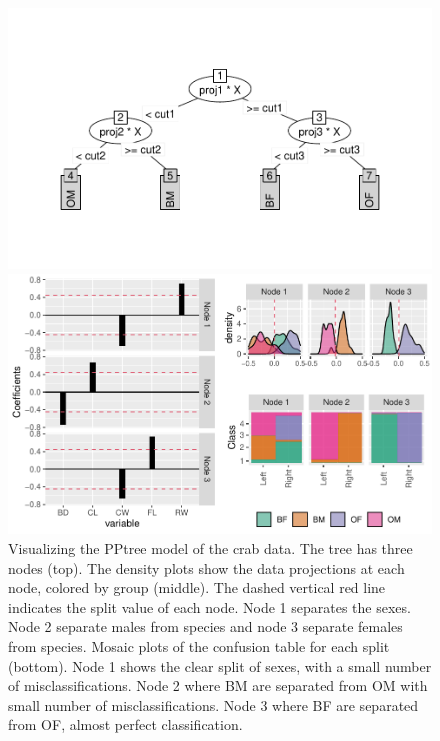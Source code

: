 \documentclass[smallextended,natbib]{svjour3}\usepackage[]{graphicx}\usepackage[]{xcolor}
\makeatletter
\def\maxwidth{ %
  \ifdim\Gin@nat@width>\linewidth
    \linewidth
  \else
    \Gin@nat@width
  \fi
}
\newenvironment{knitrout}{}{} %
\makeatother
\begin{document}
\begin{figure}[hbpt]
\centering
\begin{knitrout}
\color{fgcolor}
\includegraphics[width=\maxwidth]{trcomb-1} 

\includegraphics[width=\maxwidth]{trcomb-2} 
\end{knitrout}
\caption{Visualizing the PPtree model of the crab data. The tree has three nodes (top). The density plots show the data projections at each node, colored by group (middle). The dashed vertical red line indicates the split value of each node. Node 1 separates the sexes. Node 2 separate males from species and node 3 separate females from species. Mosaic plots of the confusion table for each split (bottom). Node 1 shows the clear split of sexes, with a small number of misclassifications. Node 2 where BM are separated from OM with small number of misclassifications. Node 3 where BF are separated from OF, almost perfect classification.\label{pptreeviz1}}
\end{figure}
\end{document}
